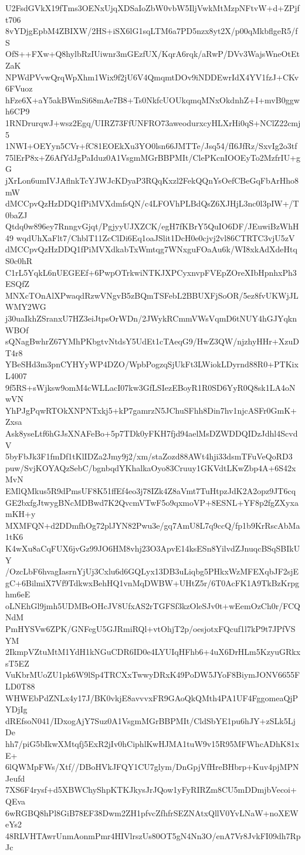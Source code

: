 U2FsdGVkX19fTms3OENxUjqXDSaIoZbW0vbW5IljVwkMtMzpNFtvW+d+ZPjft706
8vYDjgEpbM4ZBIXW/2HS+iSX6lG1sqLTM6a7PD5nzx8yt2X/p00qMkbflgeR5/fS
OfS++FXw+Q8hylbRzIUiwnr3mGEzfUX/KqrA6rqk/aRwP/DVv3WajsWneOtEtZaK
NPWdPVvwQrqWpXhm1Wix9f2jU6V4QmqmtDOv9iNDDEwrIdX4YV1fzJ+CKv6FVuoz
hFze6X+aY5akBWmSi68mAe7B8+Ts0NkfcUOUkqmqMNxOkdnhZ+I+mvB0ggwh6CP9
1RNDrurqwJ+wsz2Egq/UIRZ73FfUNFRO73aweodurxcyHLXrHi0qS+NClZ22cmj5
1NWI+OEYyn5CVr+fC81EOEkXu3YO0lsn66JMTTe/Jsq54/fI6JfRz/SxvIg2o3tf
75lErP8x+Z6AfYdJgPaIduz0A1VsgmMGrBBPMIt/ClePKcnIOOEyTo2MzfrIU+gG
jXrLon6umIVJAflnkTcYJWJcKDyaP3RQqKxzl2FekQQnYsOefCBeGqFbArHho8mW
dMCCpvQzHzDDQ1fPiMVXdmfsQN/c4LFOVhPLBdQsZ6XJHjL3nc0l3pIW+/T0baZJ
Qtdq0w896ey7RnngvGjqt/PgjyyUJXZCK/egH7fKBrY5QuIO6DF/JEuwiBzWhH49
wqdUhXaFlt7/ChblT11ZcClDi6Eq1oaJSlit1DcH0e0cjvj2vl86CTRTC3vjU5zV
dMCCpvQzHzDDQ1fPiMVXdkabTxWmtqg7WNxguFOaAu6k/WI8xkAdXdeHtqS0c0hR
C1rL5YqkL6nUEGEEf+6PwpOTrkwiNTKJXPCyxnvpFVEpZOreXIbHpnhxPh3ESQfZ
MNXcTOnAlXPwaqdRzwVNgvB5zBQmTSFebL2BBUXFjSoOR/5ez8fvUKWjJLWMY2WG
j30uaIkhZSranxU7HZ3eiJtpsOrWDn/2JWykRCmmVWsVqmD6tNUY4hGJYqknWBOf
sQNagBwhrZ67YMhPKbgtvNtdsY5UdEt1cTAeqG9/HwZ3QW/njzhyHHr+XzuDT4r8
YBeSHd3m3pnCYHYyWP4DZO/WpbPogzqSjUkFt3LWiokLDyrnd88R0+PTKixL4007
9f5RS+sWjksw9omM4cWLLacI07kw3GfLSIezEBoyR1R0SD6YyR0Q8sk1LA4oNwVN
YhPJgPqwRTOkXNPNTxkj5+kP7gamrzN5JChuSFhh8Din7hv1njcASFr0GmK+Zxsa
Ask8yseLtf6hGJsXNAFeBo+5p7TDk0yFKH7fjd94aelMsDZWDDQIDzJdhl4ScvdV
5byFbJk3F1fmDf1tKlIDZa2Jmy9j2/xm/staZozd88AWt4hji33dsmTFuVeQoRD3
puw/SvjKOYAQzSebC/bgnbqdYKhalkaOyo83Cruuy1GKVdtLKwZbp4A+6S42xMvN
EMlQMkus5R9dPmsUF8K51ffEf4eo3j78IZk4Z8aVmt7TuHtpzJdK2A2opz9JT6cq
GE2bxfgJtwygBNcMDBwd7K2QvcmVTwF5o9qxmoVP+8ESNL+YF8p2fgZXyxamKH+y
MXMFQN+d2DDmfhOg72plJYN82Pwu3e/gq7AmU8L7q9ccQ/fp1b9KrRscAbMa1tK6
K4wXu8aCqFUX6jvGz99JO6HM8vhj23O3ApvE14ksESn8YilvdZJnuqcBSqSBIkUY
/OzcLbF6hvagIasrnYjUj3Cxlu6d6GQLyx13DB3uLiqbg5PHkxWzMFEXqbJF2sjE
gC+6BilmiX7Vf9TdkwxBehHQ1vnMqDWBW+UHtZ5r/6T0AcFK1A9TkBzKrpghm6eE
oLNEhGl9jmh5UDMBeOHcJV8UfxAS2rTGFSf3kzOleSJv0t+wEemOzCh0r/FCQNdM
PmHYSVw6ZPK/GNFegU5GJRmiRQl+vtOhjT2p/oesjotxFQcuf1l7kP9t7JPfVSYM
2IkmpVZtuMtM1YdH1kNGuCDR6ID0e4LYUIqHFhb6+4uX6DrHLm5KzyuGRkxsT5EZ
VuKbrMUoZU1pk6W9lSp4TRCXxTwwyDRxK49PoDW5JYoF8BiymJONV6655FLD0T88
WHWEbPdZNLx4y17J/BK0vkjE8avvvxFR9GAoQkQMth4PA1UF4FggomeaQjPYDjIg
dREfsoN041/IDxogAjY7Suz0A1VsgmMGrBBPMIt/CldSbYE1pu6hJY+zSLk5LjDe
hh7/piG5bIkwXMtqfj5ExR2jIv0hCiphlKwHJMA1tuW9v15R95MFWhcADhK81xE+
6lQWMpFWs/Xtf//DBoHVkJFQY1CU7glym/DnGpjVfHreBHbrp+Kuv4pjMPNJeufd
7XS6F4rysf+d5XBWChyShpKTKJkysJrJQow1yFyRIRZm8CU5mDDmjbVecoi+QEva
6wRGBQ8hPl8GiB78EF38Dwm2ZH1pfvcZfhfrSEZNAtxQllV0YvLNaW+noXEWeYs2
48RLVHTAwrUnmAonmPmr4HIVlrszUs80OT5gN4Nn3O/enA7Vr8JvkFI09dh7RpJc
